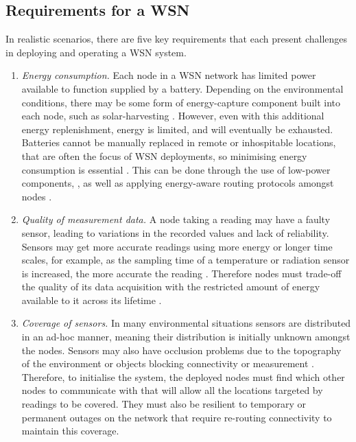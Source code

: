 \subsection{Requirements for a WSN}
\label{section:background:requirements}
In realistic scenarios, there are five key requirements that each present challenges in deploying and operating a WSN system.
\begin{enumerate}
\item \label{requirement:energy}\textit{Energy consumption.} Each node in a WSN network has limited power available to function supplied by a battery. Depending on the environmental conditions, there may be some form of energy-capture component built into each node, such as solar-harvesting \citep{Prauzek2018}. However, even with this additional energy replenishment, energy is limited, and will eventually be exhausted. Batteries cannot be manually replaced in remote or inhospitable locations, that are often the focus of WSN deployments, so minimising energy consumption is essential \citep{Anastasi2009}. This can be done through the use of low-power components, \citep{4772585, 8108667}, as well as applying energy-aware routing protocols amongst nodes \citep{s90100445}. 

\item \label{requirement:quality} \textit{Quality of measurement data.} A node taking a reading may have a faulty sensor, leading to variations in the recorded values and lack of reliability. Sensors may get more accurate readings using more energy or longer time scales, for example, as the sampling time of a temperature or radiation sensor is increased, the more accurate the reading \citep{s17061221}. Therefore nodes must trade-off the quality of its data acquisition with the restricted amount of energy available to it across its lifetime \citep{7845391}.

\item \label{requirement:coverage} \textit{Coverage of sensors.} In many environmental situations sensors are distributed in an ad-hoc manner, meaning their distribution is initially unknown amongst the nodes. Sensors may also have occlusion problems due to the topography of the environment or objects blocking connectivity or measurement \citep{10.1007/978-3-540-69170-9_23}. Therefore, to initialise the system, the deployed nodes must find which other nodes to communicate with that will allow all the locations targeted by readings to be covered. They must also be resilient to temporary or permanent outages on the network that require re-routing connectivity to maintain this coverage.


\end{enumerate}
